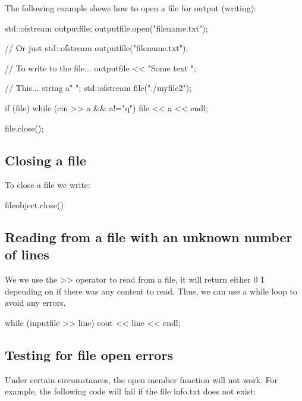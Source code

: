 \documentclass{report}
\begin{document}
    \bigbreak \noindent 
    The following example shows how to open a file for output (writing):
    \bigbreak \noindent 
    
    \begin{cppcode}
std::ofstream outputfile;
outputfile.open("filename.txt");

// Or just
std::ofstream outputfile("filename.txt");

// To write to the file...
outputfile << "Some text \n";

// This...
string a{" "};
std::ofstream file("./myfile2");

if (file) {
    while (cin >> a && a!="q") {
        file << a << endl;
    }
}

file.close();
    \end{cppcode}
    

    \bigbreak \noindent 
    \subsection{Closing a file}
    \bigbreak \noindent 
    To close a file we write:
    \bigbreak \noindent 
    
    \begin{cppcode}
fileobject.close()
    \end{cppcode}
    

    \pagebreak \bigbreak \noindent 
    \subsection{Reading from a file with an unknown number of lines}
    \bigbreak \noindent 
    We we use the >> operator to read from a file, it will return either 0 1 depending on if there was any content to read. Thus, we can use a while loop to avoid any errors.
    \bigbreak \noindent 
    
    \begin{cppcode}
while (inputfile >> line){
    cout << line << endl;
}
    \end{cppcode}
    

    \bigbreak \noindent 
    \subsection{Testing for file open errors}
    \bigbreak \noindent 
    Under certain circumstances, the open member function will not work. For example, the following code will fail if the file info.txt does not exist:
    \bigbreak \noindent 
    
\end{document}
